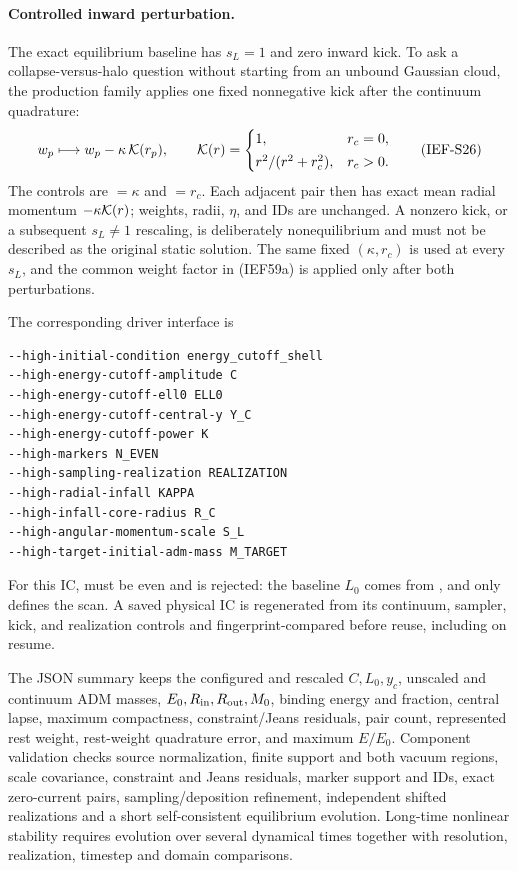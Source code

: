 \paragraph{Controlled inward perturbation.}
The exact equilibrium baseline has \(s_L=1\) and zero inward kick.  To ask a
collapse-versus-halo question without starting from an unbound Gaussian
cloud, the production family applies one fixed nonnegative kick after the
continuum quadrature:
\[
 w_p\longmapsto w_p-\kappa\,{\cal K}(r_p),\qquad
 {\cal K}(r)=
 \begin{cases}
 1,&r_c=0,\\[2pt]
 r^2/(r^2+r_c^2),&r_c>0.
 \end{cases}                                           \tag{IEF-S26}
\]
The controls are  \(=\kappa\) and
 \(=r_c\).  Each adjacent pair then has exact
mean radial momentum \(-\kappa{\cal K}(r)\); weights, radii, \(\eta\), and IDs
are unchanged.  A nonzero kick, or a subsequent \(s_L\ne1\) rescaling, is
deliberately nonequilibrium and must not be described as the original static
solution.  The same fixed \((\kappa,r_c)\) is used at every \(s_L\), and the
common weight factor in (IEF59a) is applied only after both perturbations.

The corresponding driver interface is
\begin{lstlisting}[basicstyle=\ttfamily\scriptsize]
--high-initial-condition energy_cutoff_shell
--high-energy-cutoff-amplitude C
--high-energy-cutoff-ell0 ELL0
--high-energy-cutoff-central-y Y_C
--high-energy-cutoff-power K
--high-markers N_EVEN
--high-sampling-realization REALIZATION
--high-radial-infall KAPPA
--high-infall-core-radius R_C
--high-angular-momentum-scale S_L
--high-target-initial-adm-mass M_TARGET
\end{lstlisting}
For this IC,  must be even and
 is rejected: the baseline
\(L_0\) comes from , and only
 defines the scan.  A saved physical IC
is regenerated from its continuum, sampler, kick, and realization controls
and fingerprint-compared before reuse, including on resume.

The JSON summary keeps the configured and rescaled \(C,L_0,y_c\), unscaled
and continuum ADM masses, \(E_0,R_{\rm in},R_{\rm out},M_0\), binding energy
and fraction, central lapse, maximum compactness, constraint/Jeans residuals,
pair count, represented rest weight, rest-weight quadrature error, and maximum
\(E/E_0\).  Component validation checks source normalization, finite support and both
vacuum regions, scale covariance, constraint and Jeans residuals, marker
support and IDs, exact zero-current pairs, sampling/deposition refinement,
independent shifted realizations and a short self-consistent equilibrium
evolution. Long-time nonlinear stability requires evolution over several
dynamical times together with resolution, realization, timestep and domain
comparisons.

